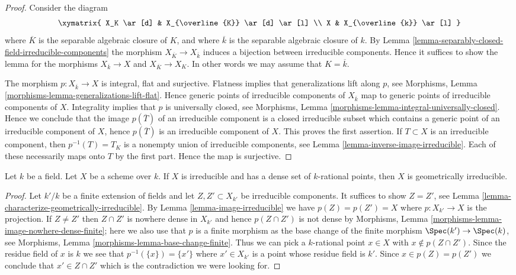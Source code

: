 \begin{proof}
Consider the diagram
$$
\xymatrix{
X_K \ar[d] & X_{\overline{K}} \ar[d] \ar[l] \\
X & X_{\overline{k}} \ar[l]
}
$$
where $\overline{K}$ is the separable algebraic closure of $K$, and
where $\overline{k}$ is the separable algebraic closure of $k$. By
Lemma \ref{lemma-separably-closed-field-irreducible-components}
the morphism $X_{\overline{K}} \to X_{\overline{k}}$ induces
a bijection between irreducible components. Hence it suffices
to show the lemma for the morphisms
$X_{\overline{k}} \to X$ and $X_{\overline{K}} \to X_K$.
In other words we may assume that $K = \overline{k}$.

\medskip\noindent
The morphism $p : X_{\overline{k}} \to X$ is integral, flat and surjective.
Flatness implies that generalizations lift along $p$, see
Morphisms, Lemma \ref{morphisms-lemma-generalizations-lift-flat}.
Hence generic points of irreducible components of $X_{\overline{k}}$
map to generic points of irreducible components of $X$.
Integrality implies that $p$ is universally closed, see
Morphisms, Lemma \ref{morphisms-lemma-integral-universally-closed}.
Hence we conclude that the image $p(\overline{T})$ of an irreducible component
is a closed irreducible subset which contains a generic point of an
irreducible component of $X$, hence $p(\overline{T})$
is an irreducible component of $X$. This proves the first assertion.
If $T \subset X$ is an irreducible component, then $p^{-1}(T) =T_K$
is a nonempty union of irreducible components, see
Lemma \ref{lemma-inverse-image-irreducible}.
Each of these necessarily maps onto $T$ by the first part.
Hence the map is surjective.
\end{proof}

\begin{lemma}
\label{lemma-irreducible-dense-rational-points-geometrically-irreducible}
Let $k$ be a field. Let $X$ be a scheme over $k$. If $X$ is irreducible
and has a dense set of $k$-rational points, then $X$ is geometrically
irreducible.
\end{lemma}

\begin{proof}
Let $k'/k$ be a finite extension of fields and let $Z, Z' \subset X_{k'}$
be irreducible components. It suffices to show $Z = Z'$, see
Lemma \ref{lemma-characterize-geometrically-irreducible}.
By Lemma \ref{lemma-image-irreducible} we have $p(Z) = p(Z') = X$
where $p : X_{k'} \to X$ is the projection. If $Z \not = Z'$
then $Z \cap Z'$ is nowhere dense in $X_{k'}$ and hence $p(Z \cap Z')$
is not dense by
Morphisms, Lemma \ref{morphisms-lemma-image-nowhere-dense-finite};
here we also use that $p$ is a finite morphism as the base change
of the finite morphism $\Spec(k') \to \Spec(k)$, see
Morphisms, Lemma \ref{morphisms-lemma-base-change-finite}.
Thus we can pick a $k$-rational point $x \in X$ with
$x \not \in p(Z \cap Z')$. Since the residue field of $x$ is $k$
we see that $p^{-1}(\{x\}) = \{x'\}$ where $x' \in X_{k'}$
is a point whose residue field is $k'$. Since $x \in p(Z) = p(Z')$
we conclude that $x' \in Z \cap Z'$ which is the contradiction
we were looking for.
\end{proof}

